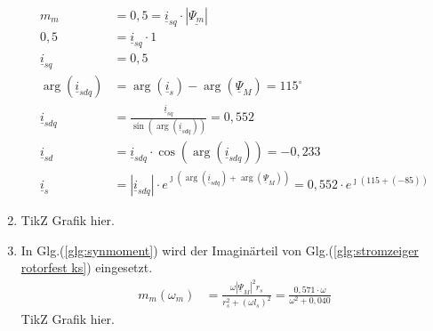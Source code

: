 \begin{solution}
\begin{enumerate}
\begin{align}
m_m &= 0,5 = \underline{i}_{sq} \cdot |\underline{\Psi_m}|\\
0,5 &= \underline{i}_{sq} \cdot 1\\
\underline{i}_{sq} &= 0,5\\
\arg(\underline{i}_{sdq}) &= \arg(\underline{i}_{s}) -\arg(\underline{\Psi}_{M})=115^\circ\\
\underline{i}_{sdq} &= \frac{\underline{i}_{sq}}{\sin(\arg(\underline{i}_{sdq}))}= 0,552\\
\underline{i}_{sd} &= \underline{i}_{sdq} \cdot \cos(\arg(\underline{i}_{sdq})) = -0,233\\
\underline{i}_{s} &= |\underline{i}_{sdq}| \cdot e^{\jmath (\arg(\underline{i}_{sdq}) + \arg(\underline{\Psi}_{M}))}= 0,552 \cdot e^{\jmath ( 115 + (-85))}
\end{align}
\item TikZ Grafik hier.
\item In Glg.(\ref{glg:synmoment}) wird der Imaginärteil von Glg.(\ref{glg:stromzeiger rotorfest ks}) eingesetzt.
\begin{align}
m_m(\omega_m) &= \frac{\omega |\underline{\Psi}_M|^2 r_s}{r_s^2 + (\omega l_s)^2}=\frac{0,571 \cdot \omega}{\omega^2 + 0,040}
\end{align}
TikZ Grafik hier.
\end{enumerate}
\end{solution}